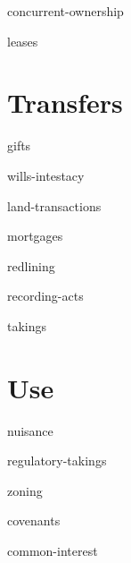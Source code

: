 \documentclass[12pt]{book}
\begin{document}
\module concurrent-ownership

\module leases



\part{Transfers}

\module gifts

\module wills-intestacy

\module land-transactions

\module mortgages

\module redlining

\module recording-acts

%
%

\module takings


\part{Use}

\module nuisance

\module regulatory-takings

\module zoning

\module covenants

\module common-interest
\end{document}

